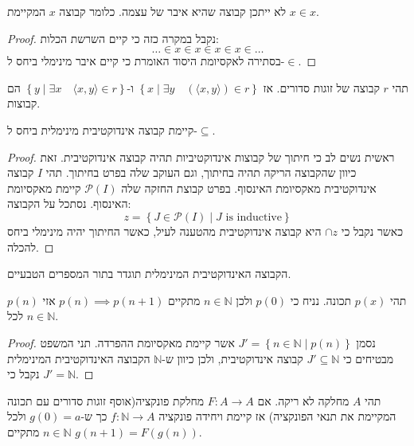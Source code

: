 \documentclass{tstextbook}
\begin{document}
\begin{proposition}
לא ייתכן קבוצה שהיא איבר של עצמה. כלומר קבוצה \(x\) המקיימת \(x \in x\).

\end{proposition}
\begin{proof}
נקבל במקרה כזה כי קיים השרשת הכלות:
$$\dots\in x \in x \in x \in x \in \dots $$
בסתירה לאקסיומת היסוד האומרת כי קיים איבר מינימלי ביחס ל-\(\in\).

\end{proof}
\begin{proposition}
תהי \(r\) קבוצה של זוגות סדורים. אז \(\left\{  x\mid \exists y\quad\left( \langle x,y \rangle \right)\in r  \right\}\) ו-\(\left\{  y\mid \exists x\quad\langle x,y \rangle\in r  \right\}\) הם קבוצות.

\end{proposition}
\begin{proposition}
קיימת קבוצה אינדוקטיבית מינימלית ביחס ל-\(\subseteq\).

\end{proposition}
\begin{proof}
ראשית נשים לב כי חיתוך של קבוצות אינדוקטיביות תהיה קבוצה אינדוקטיבית. זאת כיוון שהקבוצה הריקה תהיה בחיתוך, וגם העוקב שלה בפרט בחיתוך.
תהי \(I\) קבוצה אינדוקטיבית מאקסיומת האינסוף. בפרט קבוצת החזקה שלה \(\mathcal{P}(I)\) קיימת מאקסיומת האינסוף. נסתכל על הקבוצה:
$$z=\left\{  J \in \mathcal{P}(I) \mid J\text{ is inductive}   \right\}$$
כאשר נקבל כי \(\cap z\) היא קבוצה אינדוקטיבית מהטענה לעיל, כאשר החיתוך יהיה מינימלי ביחס להכלה.

\end{proof}
\begin{definition}
הקבוצה האינדוקטיבית המינימלית תוגדר בתור המספרים הטבעיים.

\end{definition}
\begin{proposition}
תהי \(p(x)\) תכונה. נניח כי \(p(0)\) ולכן \(n \in \mathbb{N}\) מתקיים \(p(n)\implies p(n+1)\) אזי \(p(n)\) לכל \(n \in \mathbb{N}\).

\end{proposition}
\begin{proof}
נסמן \(J'=\left\{   n \in \mathbb{N}\mid p(n)  \right\}\) אשר קיימת מאקסיומת ההפרדה. תני המשפט מבטיחים כי \(J' \subseteq \mathbb{N}\) קבוצה אינדוקטיבית, ולכן כיוון ש-\(\mathbb{N}\) הקבוצה האינדוקטיבית המינימלית נקבל כי \(J'=\mathbb{N}\).

\end{proof}
\begin{definition}
תהי \(A\) מחלקה לא ריקה. אם \(F:A\to A\) מחלקת פונקציה(אוסף זוגות סדורים עם תכונה המקיימת את תנאי הפונקציה) אז קיימת ויחידה פונקציה \(f:\mathbb{N}\to A\) כך ש-\(g(0)=a\) ולכל \(n \in \mathbb{N}\) מתקיים \(g(n+1)=F(g(n))\).

\end{definition}
\end{document}
